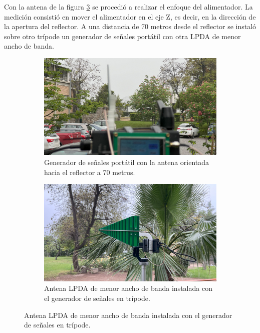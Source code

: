 Con la antena de la figura \ref{fig:antena_lpda} se procedió a realizar el enfoque del alimentador. La medición consistió en mover el alimentador en el eje Z, es decir, en la dirección de la apertura del reflector. A una distancia de 70 metros desde el reflector se instaló sobre otro trípode un generador de señales portátil con otra LPDA de menor ancho de banda.\\

\begin{figure}[h!]
    \centering
    \begin{subfigure}{0.45\textwidth}
        \includegraphics[width=\textwidth]{img/enfoque_cerca}
        \caption{Generador de señales portátil con la antena orientada hacia el reflector a 70 metros.}
        \label{fig:generador}
    \end{subfigure}
    \begin{subfigure}{0.45\textwidth}
        \includegraphics[width=\textwidth]{img/enfoque_cerca1}
        \caption{Antena LPDA de menor ancho de banda instalada con el generador de señales en trípode.}
        \label{fig:antena_lpda}
    \end{subfigure}
\end{figure}

